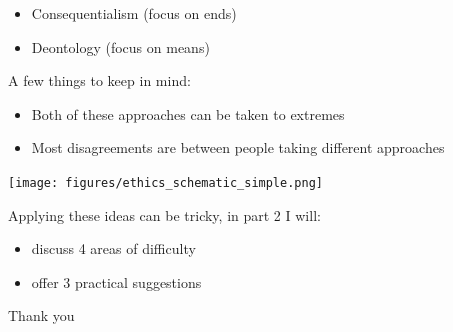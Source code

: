 \documentclass{beamer}
\begin{document}
\begin{frame}

\begin{itemize}
\item Consequentialism (focus on ends)
\item Deontology (focus on means)
\end{itemize}
\pause
\vfill
A few things to keep in mind:
\begin{itemize}
\item Both of these approaches can be taken to extremes
\pause
\item Most disagreements are between people taking different approaches 
\end{itemize}

\end{frame}
%
%
\begin{frame}

\begin{center}
\texttt{[image: figures/ethics\_schematic\_simple.png]}
\end{center}

\end{frame}
\begin{frame}

Applying these ideas can be tricky, in part 2 I will:
\begin{itemize}
\item discuss 4 areas of difficulty
\item offer 3 practical suggestions
\end{itemize}

\end{frame}
\begin{frame}

\begin{center}
\LARGE
Thank you
\end{center}

\end{frame}
\end{document}
